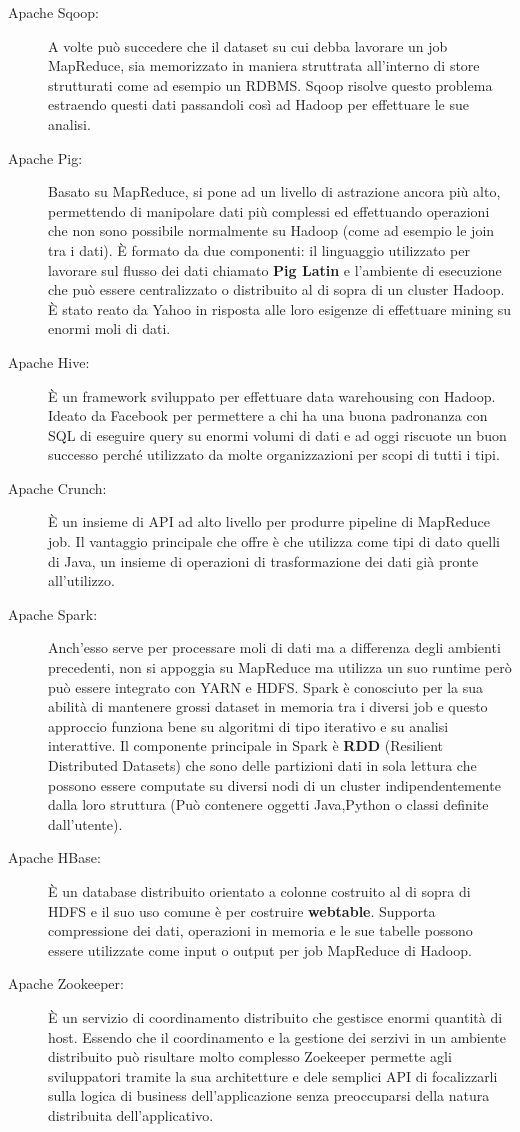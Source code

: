 \begin{description}
  \item[Apache Sqoop:] A volte può succedere che il dataset su cui debba lavorare un job MapReduce, sia memorizzato in maniera struttrata all'interno di store strutturati come ad esempio un RDBMS. Sqoop risolve questo problema estraendo questi dati passandoli così ad Hadoop per effettuare le sue analisi.
  \item[Apache Pig:] Basato su MapReduce, si pone ad un livello di astrazione ancora più alto, permettendo di manipolare dati più complessi ed effettuando operazioni che non sono possibile normalmente su Hadoop (come ad esempio le join tra i dati). È formato da due componenti: il linguaggio utilizzato per lavorare sul flusso dei dati chiamato \textbf{Pig Latin} e l'ambiente di esecuzione che può essere centralizzato o distribuito al di sopra di un cluster Hadoop. È stato reato da Yahoo in risposta alle loro esigenze di effettuare mining su enormi moli di dati. 
  \item[Apache Hive:] È un framework sviluppato per effettuare data warehousing con Hadoop. Ideato da Facebook per permettere a chi ha una buona padronanza con SQL di eseguire query su enormi volumi di dati e ad oggi riscuote un buon successo perché utilizzato da molte organizzazioni per scopi di tutti i tipi.
  \item[Apache Crunch:] È un insieme di API ad alto livello per produrre pipeline di MapReduce job. Il vantaggio principale che offre è che utilizza come tipi di dato quelli di Java, un insieme di operazioni di trasformazione dei dati già pronte all'utilizzo.
  \item[Apache Spark:] Anch'esso serve per processare moli di dati ma a differenza degli ambienti precedenti, non si appoggia su MapReduce ma utilizza un suo runtime  però può essere integrato con YARN e HDFS. Spark è conosciuto per la sua abilità di mantenere grossi dataset in memoria tra i diversi job e questo approccio funziona bene su algoritmi di tipo iterativo e su analisi interattive. Il componente principale in Spark è \textbf{RDD} (Resilient Distributed Datasets) che sono delle partizioni dati in sola lettura che possono essere computate su diversi nodi di un cluster indipendentemente dalla loro struttura (Può contenere oggetti Java,Python o classi definite dall'utente).
  \item[Apache HBase:] È un database distribuito orientato a colonne costruito al di sopra di HDFS e il suo uso comune è per costruire \textbf{webtable}. Supporta compressione dei dati, operazioni in memoria e le sue tabelle possono essere utilizzate come input o output per job MapReduce di Hadoop.
  \item[Apache Zookeeper:] È un servizio di coordinamento distribuito che gestisce enormi quantità di host. Essendo che il coordinamento e la gestione dei serzivi in un ambiente distribuito può risultare molto complesso Zoekeeper permette agli sviluppatori tramite la sua architetture e dele semplici API di focalizzarli sulla logica di business dell'applicazione senza preoccuparsi della natura distribuita dell'applicativo.
\end{description}
